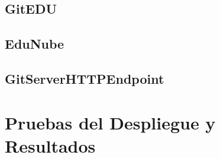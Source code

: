 \subsection{GitEDU}

\subsection{EduNube}

\subsection{GitServerHTTPEndpoint}

\section{Pruebas del Despliegue y Resultados}
